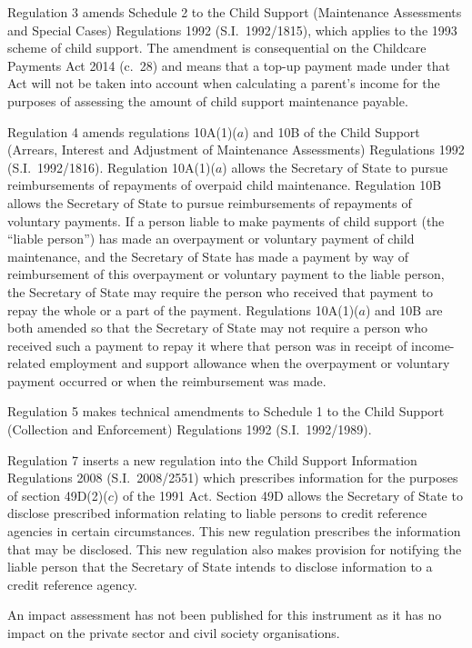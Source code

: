 \documentclass[12pt,a4paper]{article}
\begin{document}
Regulation 3 amends Schedule 2 to the Child Support (Maintenance Assessments and Special Cases) Regulations 1992 (S.I.~1992/1815), which applies to the 1993 scheme of child support. The amendment is consequential on the Childcare Payments Act 2014 (c.~28) and means that a top-up payment made under that Act will not be taken into account when calculating a parent’s income for the purposes of assessing the amount of child support maintenance payable.

Regulation 4 amends regulations 10A(1)($a$)  and 10B of the Child Support (Arrears, Interest and Adjustment of Maintenance Assessments) Regulations 1992 (S.I.~1992/1816). Regulation 10A(1)($a$)  allows the Secretary of State to pursue reimbursements of repayments of overpaid child maintenance. Regulation 10B allows the Secretary of State to pursue reimbursements of repayments of voluntary payments. If a person liable to make payments of child support (the “liable person”) has made an overpayment or voluntary payment of child maintenance, and the Secretary of State has made a payment by way of reimbursement of this overpayment or voluntary payment to the liable person, the Secretary of State may require the person who received that payment to repay the whole or a part of the payment. Regulations 10A(1)($a$)  and 10B are both amended so that the Secretary of State may not require a person who received such a payment to repay it where that person was in receipt of income-related employment and support allowance when the overpayment or voluntary payment occurred or when the reimbursement was made.

Regulation 5 makes technical amendments to Schedule 1 to the Child Support (Collection and Enforcement) Regulations 1992 (S.I.~1992/1989).

Regulation 7 inserts a new regulation into the Child Support Information Regulations 2008 (S.I.~2008/2551) which prescribes information for the purposes of section 49D(2)($c$)  of the 1991 Act. Section 49D allows the Secretary of State to disclose prescribed information relating to liable persons to credit reference agencies in certain circumstances. This new regulation prescribes the information that may be disclosed. This new regulation also makes provision for notifying the liable person that the Secretary of State intends to disclose information to a credit reference agency.

An impact assessment has not been published for this instrument as it has no impact on the private sector and civil society organisations. 
\end{document}
